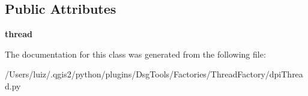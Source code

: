 \subsection*{Public Attributes}
\begin{DoxyCompactItemize}
\item 
\mbox{\label{class_dsg_tools_1_1_factories_1_1_thread_factory_1_1dpi_thread_1_1_dpi_messages_a33b9b457cccd71e658fb3e3a57c89da5}} 
{\bfseries thread}
\end{DoxyCompactItemize}


The documentation for this class was generated from the following file\+:\begin{DoxyCompactItemize}
\item 
/\+Users/luiz/.\+qgis2/python/plugins/\+Dsg\+Tools/\+Factories/\+Thread\+Factory/dpi\+Thread.\+py\end{DoxyCompactItemize}
